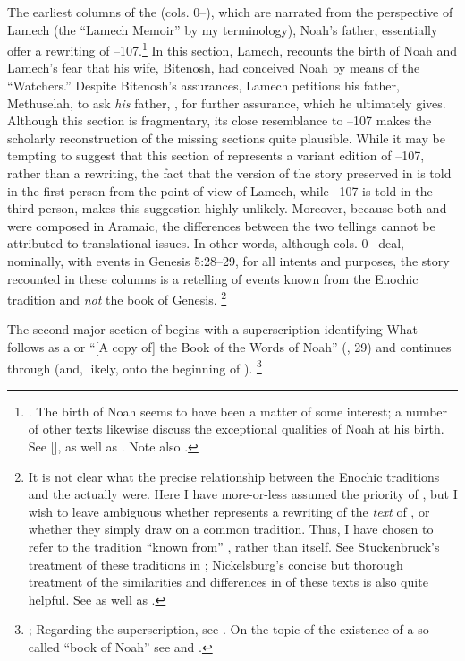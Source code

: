 The earliest columns of the \ga (cols. 0--), which are narrated from the perspective of Lamech (the ``Lamech Memoir'' by my terminology), Noah's father, essentially offer a rewriting of --107.\footnote{\cite[174]{nickelsburg2005}. The birth of Noah seems to have been a matter of some interest; a number of other texts likewise discuss the exceptional qualities of Noah at his birth. See [],  as well as \cite{vanderkam_kapera1992}. Note also \cite{stuckenbruck_berthelot-etal2010}.} In this section, Lamech, recounts the birth of Noah and Lamech's fear that his wife, Bitenosh, had conceived Noah by means of the  ``Watchers.'' Despite Bitenosh's assurances, Lamech petitions his father, Methuselah, to ask \emph{his} father, \enoch, for further assurance, which he ultimately gives. Although this section is fragmentary, its close resemblance to --107 makes the scholarly reconstruction of the missing sections quite plausible. While it may be tempting to suggest that this section of \ga represents a variant edition of --107, rather than a rewriting, the fact that the version of the story preserved in \ga is told in the first-person from the point of view of Lamech, while --107 is told in the third-person, makes this suggestion highly unlikely. Moreover, because both \firstenoch and \ga were composed in Aramaic, the differences between the two tellings cannot be attributed to translational issues. In other words, although cols. 0-- deal, nominally, with events in Genesis 5:28--29, for all intents and purposes, the story recounted in these columns is a retelling of events known from the Enochic tradition and \emph{not} the book of Genesis.%
%
\footnote{It is not clear what the precise relationship between the Enochic traditions and the \ga actually were. Here I have more-or-less assumed the priority of \firstenoch, but I wish to leave ambiguous whether \ga represents a rewriting of the \emph{text} of \firstenoch, or whether they simply draw on a common tradition. Thus, I have chosen to refer to the tradition ``known from'' \firstenoch, rather than \firstenoch itself. See Stuckenbruck's treatment of these traditions in \cite*{stuckenbruck_berthelot-etal2010}; Nickelsburg's concise but thorough treatment of the similarities and differences in of these texts is also quite helpful. See \cite[173--174]{nickelsburg2005} as well as \cite[122--123]{fitzmyer2004}.} 


The second major section of \ga begins with a superscription identifying What follows as a  or ``[A copy of] the Book of the Words of Noah'' (, 29) and continues through  (and, likely, onto the beginning of ).%
%
\footnote{\cite[174--175]{nickelsburg2005}; Regarding the superscription, see \cite{steiner_dsd1995}. On the topic of the existence of a so-called ``book of Noah'' see \cite{dimant_vanderkam-etal2006} and \cite{werman_chazon-etal1999}.}

